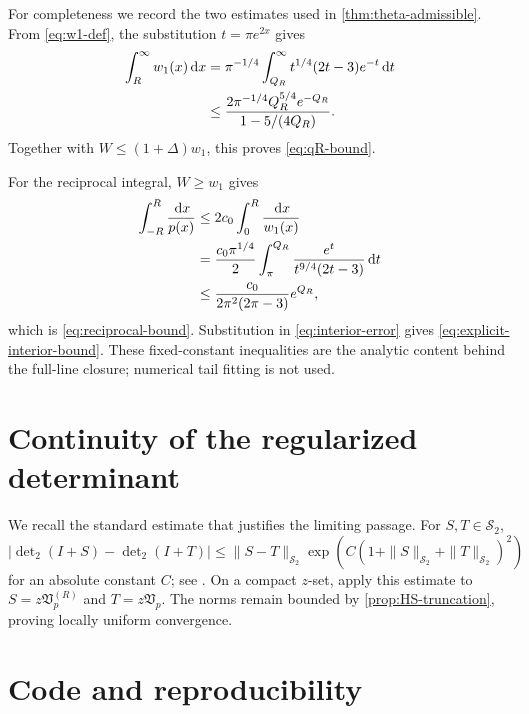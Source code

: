 \documentclass[11pt,reqno]{amsart}
\numberwithin{equation}{section}
\newcommand{\1}{\mathbf 1}
\newcommand{\HS}{\mathcal S_2}
\newcommand{\Vp}{\mathfrak V_p}
\newcommand{\dd}{\,\mathrm d}
\newcommand{\detTwo}{\det\nolimits_{2}}
\begin{document}
For completeness we record the two estimates used in
\cref{thm:theta-admissible}.  From \eqref{eq:w1-def}, the substitution
$t=\pi e^{2x}$ gives
\begin{align}
 \int_R^\infty w_1(x)\dd x
 &=\pi^{-1/4}\int_{Q_R}^\infty
 t^{1/4}(2t-3)e^{-t}\dd t\notag\\
 &\leq\frac{2\pi^{-1/4}Q_R^{5/4}e^{-Q_R}}
 {1-5/(4Q_R)}.
 \label{eq:appendix-q-tail}
\end{align}
Together with $W\leq(1+\Delta)w_1$, this proves
\eqref{eq:qR-bound}.

For the reciprocal integral, $W\geq w_1$ gives
\begin{align}
 \int_{-R}^R\frac{\dd x}{p(x)}
 &\leq2c_0\int_0^R\frac{\dd x}{w_1(x)}\notag\\
 &=\frac{c_0\pi^{1/4}}2
 \int_\pi^{Q_R}\frac{e^t}{t^{9/4}(2t-3)}\dd t\notag\\
 &\leq\frac{c_0}{2\pi^2(2\pi-3)}e^{Q_R},
 \label{eq:appendix-reciprocal}
\end{align}
which is \eqref{eq:reciprocal-bound}.  Substitution in
\eqref{eq:interior-error} gives \eqref{eq:explicit-interior-bound}.  These
fixed-constant inequalities are the analytic content behind the full-line
closure; numerical tail fitting is not used.

\section{Continuity of the regularized determinant}

We recall the standard estimate that justifies the limiting passage.  For
$S,T\in\HS$,
\begin{equation}\label{eq:det2-continuity}
 |\detTwo(I+S)-\detTwo(I+T)|
 \leq \|S-T\|_{\HS}
 \exp\!\left(C(1+\|S\|_{\HS}+\|T\|_{\HS})^2\right)
\end{equation}
for an absolute constant $C$; see \cite[Chapter 9]{Simon2005}.  On a compact
$z$-set, apply this estimate to $S=z\Vp^{(R)}$ and $T=z\Vp$.  The norms remain
bounded by \cref{prop:HS-truncation}, proving locally uniform convergence.

\section{Code and reproducibility}
\end{document}
